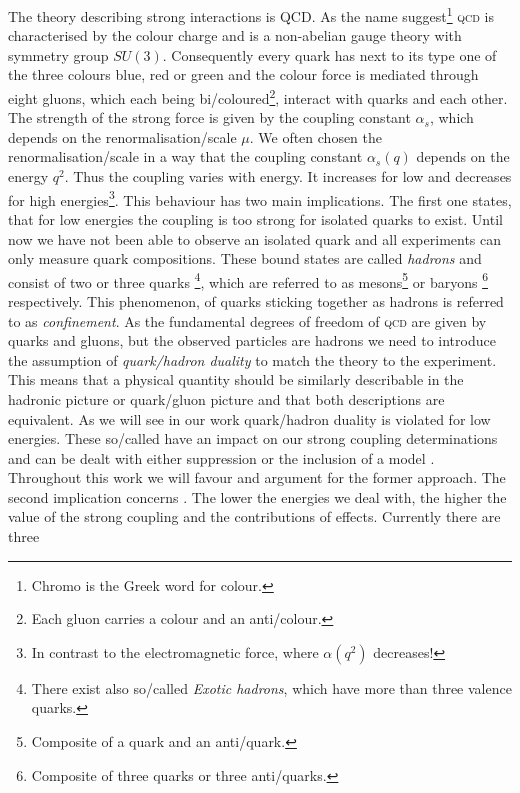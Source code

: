 \documentclass[../../index.tex]{subfiles}
\begin{document}
The theory describing strong interactions is \textsc{QCD}. As the name
suggest\footnote{Chromo is the Greek word for colour.} \textsc{qcd} is
characterised by the colour charge and is a non-abelian gauge theory with
symmetry group $SU(3)$. Consequently every quark has next to its type one of the
three colours blue, red or green and the colour force is mediated through eight
gluons, which each being bi\-/coloured\footnote{Each gluon carries a colour and
  an anti\-/colour.}, interact with quarks and each other. The strength of the
strong force is given by the coupling constant $\alpha_s$, which depends on the
renormalisation\-/scale $\mu$. We often chosen the renormalisation\-/scale in a
way that the coupling constant $\alpha_s(q)$ depends on the energy $q^2$. Thus
the coupling varies with energy. It increases for low and decreases for high
energies\footnote{In contrast to the electromagnetic force, where $\alpha(q^2)$
  decreases!}. This behaviour has two main implications. The first one states,
that for low energies the coupling is too strong for isolated quarks to exist.
Until now we have not been able to observe an isolated quark and all experiments
can only measure quark compositions. These bound states are called
\textit{hadrons} and consist of two or three quarks \footnote{There exist also
  so\-/called \textit{Exotic hadrons}, which have more than three valence
  quarks.}, which are referred to as mesons\footnote{Composite of a quark and an
  anti\-/quark.} or baryons \footnote{Composite of three quarks or three
  anti\-/quarks.} respectively. This phenomenon, of quarks sticking together as
hadrons is referred to as \textit{confinement}. As the fundamental degrees of
freedom of \textsc{qcd} are given by quarks and gluons, but the observed
particles are hadrons we need to introduce the assumption of
\textit{quark\-/hadron duality} to match the theory to the experiment. This
means that a physical quantity should be similarly describable in the hadronic
picture or quark\-/gluon picture and that both descriptions are equivalent. As
we will see in our work quark\-/hadron duality is violated for low energies.
These so\-/called  have an impact on our strong
coupling determinations and can be dealt with either suppression or the
inclusion of a model \cite{Cata2008}. Throughout this work we will favour and
argument for the former approach. The second implication concerns
. The lower the energies we deal with, the
higher the value of the strong coupling and the contributions of
 effects. Currently there are three
\end{document}
